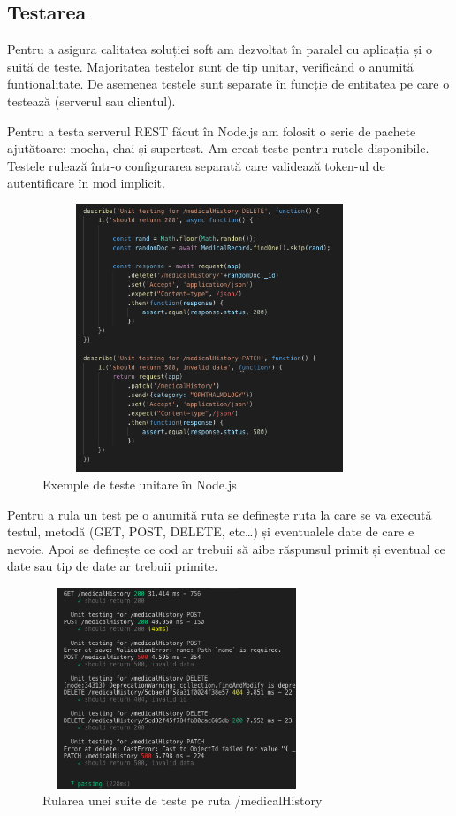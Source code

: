 \documentclass[12pt]{article}
\begin{document}
\newpage
\subsection{Testarea}

Pentru a asigura calitatea soluției soft am dezvoltat în paralel cu aplicația 
și o suită de teste. Majoritatea testelor sunt de tip unitar, verificând o anumită
funtionalitate. De asemenea testele sunt separate în funcție de entitatea pe care o testează 
(serverul sau clientul).


Pentru a testa serverul REST făcut în Node.js am folosit o serie de pachete ajutătoare: 
mocha, chai și supertest. Am creat teste pentru rutele disponibile. Testele rulează într-o
configurarea separată care validează token-ul de autentificare în mod implicit.

\begin{figure}[H]
    \centering
    \includegraphics[width=10cm, height=8cm]{unitnode.png}
    \caption{Exemple de teste unitare în Node.js}
    \end{figure}


Pentru a rula un test pe o anumită ruta se definește ruta la care se va execută testul,
metodă (GET, POST, DELETE, etc\dots) și eventualele date de care e nevoie. Apoi se definește
ce cod ar trebuii să aibe răspunsul primit și eventual ce date sau tip de date ar trebuii primite.

\begin{figure}[H]
    \centering
    \includegraphics[width=8cm, height=6cm]{confnode.png}
    \caption{Rularea unei suite de teste pe ruta /medicalHistory}
    \end{figure}
\end{document}
